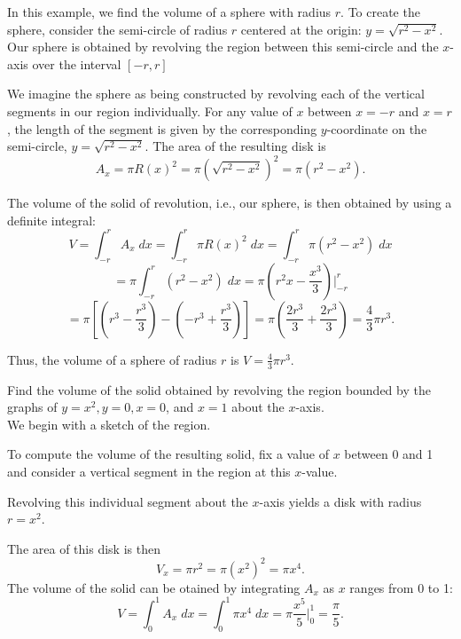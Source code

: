\documentclass{ximera}
\begin{document}
\begin{example}[example 2]
In this example, we find the volume of a sphere with radius $r$.
To create the sphere, consider the semi-circle of radius $r$ centered at the origin: $y = \sqrt{r^2 - x^2}$.
Our sphere is obtained by revolving the region between this semi-circle and the $x$-axis over the interval $[-r,r]$


We imagine the sphere as being constructed by revolving each of the vertical segments in our region individually.
For any value of $x$ between $x = -r$ and $x = r$, the length of the segment is given by the corresponding $y$-coordinate
on the semi-circle, $y = \sqrt{r^2 - x^2}$. The area of the resulting disk is 
\[
A_x = \pi R(x)^2   = \pi \left(\sqrt{r^2 - x^2}\right)^2  = \pi (r^2 - x^2).
\]


The volume of the solid of revolution, i.e., our sphere, is then obtained by using a definite integral:
\[
V = \int_{-r}^r A_x \; dx  = \int_{-r}^r \pi R(x)^2 \; dx = \int_{-r}^r \pi (r^2 - x^2) \; dx 
\]
\[
= \pi \int_{-r}^r  (r^2 - x^2) \; dx = \pi  \left(r^2 x - \frac{x^3}{3}\right)\bigg|_{-r}^r 
\]
\[
= \pi \left[ \left(r^3 - \frac{r^3}{3}\right) - \left(-r^3 + \frac{r^3}{3}\right)\right] = \pi \left(\frac{2r^3}{3} + \frac{2r^3}{3}\right) = \frac43 \pi r^3.
\]

Thus, the volume of a sphere of radius $r$ is $V = \frac43 \pi r^3$.


\end{example}

\begin{example}[example 3] Find the volume of the solid obtained by revolving the region bounded by the graphs of $y=x^2, y=0, x=0$, and $x = 1$
about the $x$-axis.\\
We begin with a sketch of the region.


To compute the volume of the resulting solid, fix a value of $x$ between 0 and 1 and consider a vertical segment in the region at this $x$-value.


Revolving this individual segment about the $x$-axis yields a disk with radius $r = x^2$. 


The area of this disk is then
\[
V_x = \pi r^2  = \pi (x^2)^2  = \pi x^4.
\]
The volume of the solid can be otained by integrating $A_x$ as $x$ ranges from 0 to 1:
\[
V = \int_0^1 A_x \; dx  = \int_0^1 \pi x^4 \; dx = \pi \frac{x^5}{5}\bigg|_0^1 = \frac{\pi}{5}.
\]


\end{example}
\end{document}
